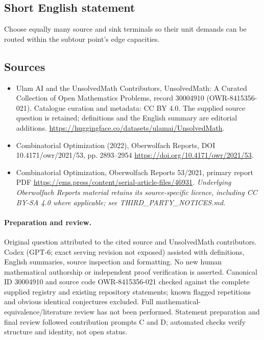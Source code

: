 \documentclass[11pt]{article}
\begin{document}
\subsection{Short English statement}
Choose equally many source and sink terminals so their unit demands can be routed within the subtour point's edge capacities.
\subsection{Sources}
\begin{itemize}
\item[\hypertarget{source:30004910:1}{S1}] Ulam AI and the UnsolvedMath Contributors, UnsolvedMath: A Curated Collection of Open Mathematics Problems, record 30004910 (OWR-8415356-021). Catalogue curation and metadata: CC BY 4.0. The supplied source question is retained; definitions and the English summary are editorial additions.
\url{https://huggingface.co/datasets/ulamai/UnsolvedMath}.
\item[\hypertarget{source:30004910:2}{S2}] Combinatorial Optimization (2022), Oberwolfach Reports, DOI 10.4171/owr/2021/53, pp. 2893--2954
\url{https://doi.org/10.4171/owr/2021/53}.
\item[\hypertarget{source:30004910:3}{S3}] Combinatorial Optimization, Oberwolfach Reports 53/2021, primary report PDF
\url{https://ems.press/content/serial-article-files/46931}.
\textit{Underlying Oberwolfach Reports material retains its source-specific licence, including CC BY-SA 4.0 where applicable; see THIRD\_PARTY\_NOTICES.md.}
\end{itemize}
\paragraph{Preparation and review.}
Original question attributed to the cited source and UnsolvedMath contributors. Codex (GPT-6; exact serving revision not exposed) assisted with definitions, English summaries, source inspection and formatting. No new human mathematical authorship or independent proof verification is asserted. Canonical ID 30004910 and source code OWR-8415356-021 checked against the complete supplied registry and existing repository statements; known flagged repetitions and obvious identical conjectures excluded. Full mathematical-equivalence/literature review has not been performed. Statement preparation and final review followed contribution prompts C and D; automated checks verify structure and identity, not open status.
\label{end:30004910}
\end{document}
